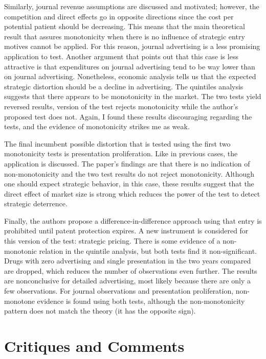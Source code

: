 \documentclass{article}
\theoremstyle{definition}
\begin{document}
Similarly, journal revenue assumptions are discussed and motivated; however, the competition and direct effects go in opposite directions since the cost per potential patient should be decreasing. This means that the main theoretical result that assures monotonicity when there is no influence of strategic entry motives cannot be applied.  For this reason, journal advertising is a less promising application to test. Another argument that points out that this case is less attractive is that expenditures on journal advertising tend to be way lower than on journal advertising. Nonetheless, economic analysis tells us that the expected strategic distortion should be a decline in advertising. The quintiles analysis suggests that there appears to be monotonicity in the market. The two tests yield reversed results, \cite{hall2000testing} version of the test rejects monotonicity while the author's proposed test does not. Again, I found these results discouraging regarding the tests, and the evidence of monotonicity strikes me as weak. 

The final incumbent possible distortion that is tested using the first two monotonicity tests is presentation proliferation. Like in previous cases, the application is discussed. The paper's findings are that there is no indication of non-monotonicity and the two test results do not reject monotonicity. Although one should expect strategic behavior, in this case, these results suggest that the direct effect of market size is strong which reduces the power of the test to detect strategic deterrence. 


Finally, the authors propose a difference-in-difference approach using that entry is prohibited until patent protection expires. A new instrument is considered for this version of the test: strategic pricing. There is some evidence of a non-monotonic relation in the quintile analysis, but both tests find it non-significant. Drugs with zero advertising and single presentation in the two years compared are dropped, which reduces the number of observations even further. The results are nonconclusive for detailed advertising, most likely because there are only a few observations. For journal observations and presentation proliferation, non-monotone evidence is found using both tests, although the non-monotonicity pattern does not match the theory (it has the opposite sign).

\section*{Critiques and Comments}
\end{document}
